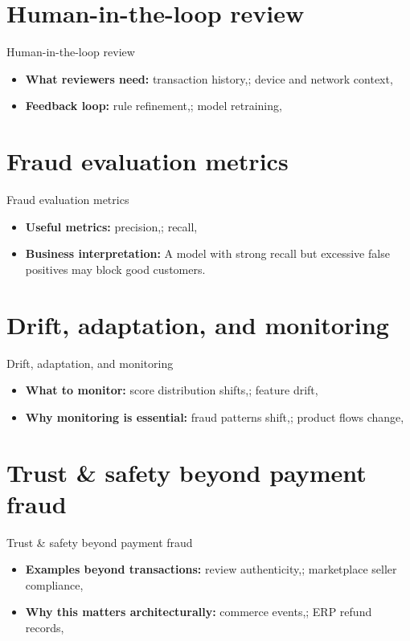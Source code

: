 \documentclass[aspectratio=169]{beamer}
\begin{document}
\section{Human-in-the-loop review}

\begin{frame}{Human-in-the-loop review}
  \begin{itemize}
    \item \textbf{What reviewers need:} transaction history,; device and network context,
    \item \textbf{Feedback loop:} rule refinement,; model retraining,
  \end{itemize}
\end{frame}

\section{Fraud evaluation metrics}

\begin{frame}{Fraud evaluation metrics}
  \begin{itemize}
    \item \textbf{Useful metrics:} precision,; recall,
    \item \textbf{Business interpretation:} A model with strong recall but excessive false positives may block good customers.
  \end{itemize}
\end{frame}

\section{Drift, adaptation, and monitoring}

\begin{frame}{Drift, adaptation, and monitoring}
  \begin{itemize}
    \item \textbf{What to monitor:} score distribution shifts,; feature drift,
    \item \textbf{Why monitoring is essential:} fraud patterns shift,; product flows change,
  \end{itemize}
\end{frame}

\section{Trust \& safety beyond payment fraud}

\begin{frame}{Trust \& safety beyond payment fraud}
  \begin{itemize}
    \item \textbf{Examples beyond transactions:} review authenticity,; marketplace seller compliance,
    \item \textbf{Why this matters architecturally:} commerce events,; ERP refund records,
  \end{itemize}
\end{frame}
\end{document}
